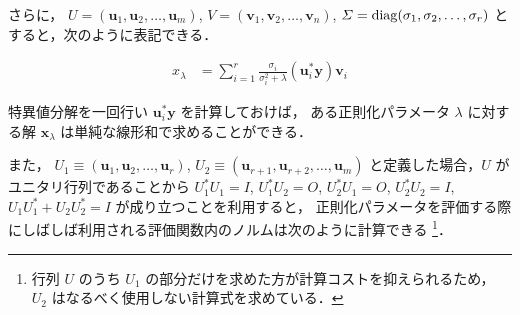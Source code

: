 さらに，
$U = (\bm{u}_1, \bm{u}_2, \ldots, \bm{u}_m)$,
$V = (\bm{v}_1, \bm{v}_2, \ldots, \bm{v}_n)$,
$\varSigma = \operatorname{diag}(\sigma_1, \sigma_2, \ldots, \sigma_r)$
とすると，次のように表記できる．

\begin{align}
    x_{\lambda}
     & = \sum_{i = 1}^{r} \frac{\sigma_i}{\sigma_i^2 + \lambda} (\bm{u}_i^* \bm{y}) \bm{v}_i
    \label{eq:regularization_tikhonov_solution-by-svd}
\end{align}

特異値分解を一回行い
$\bm{u}_i^* \bm{y}$
を計算しておけば，
ある正則化パラメータ $\lambda$ に対する解 $\bm{x}_{\lambda}$ は単純な線形和で求めることができる．

また，
$U_1 \equiv (\bm{u}_1, \bm{u}_2, \ldots, \bm{u}_r)$,
$U_2 \equiv (\bm{u}_{r+1}, \bm{u}_{r+2}, \ldots, \bm{u}_m)$
と定義した場合，$U$ がユニタリ行列であることから
$U_1^* U_1 = I$,
$U_1^* U_2 = O$,
$U_2^* U_1 = O$,
$U_2^* U_2 = I$,
$U_1 U_1^* + U_2 U_2^* = I$
が成り立つことを利用すると，
正則化パラメータを評価する際にしばしば利用される評価関数内のノルムは次のように計算できる
\footnote{行列 $U$ のうち $U_1$ の部分だけを求めた方が計算コストを抑えられるため，%
    $U_2$ はなるべく使用しない計算式を求めている．}．

